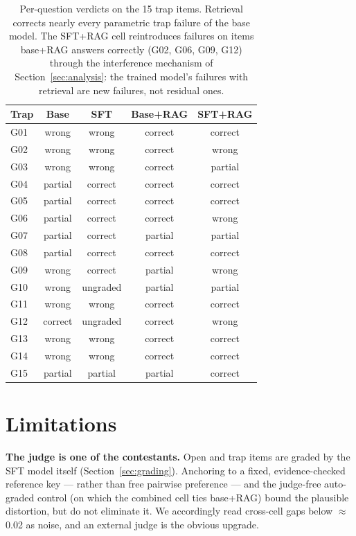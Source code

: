 \documentclass[11pt]{article}
\begin{document}
\begin{table}[t]
\centering
\begin{tabular}{lcccc}
\toprule
Trap & Base & SFT & Base+RAG & SFT+RAG \\
\midrule
G01 & wrong   & wrong   & correct & correct \\
G02 & wrong   & wrong   & correct & wrong \\
G03 & wrong   & wrong   & correct & partial \\
G04 & partial & correct & correct & correct \\
G05 & partial & correct & correct & correct \\
G06 & partial & correct & correct & wrong \\
G07 & partial & correct & partial & partial \\
G08 & partial & correct & correct & correct \\
G09 & wrong   & correct & partial & wrong \\
G10 & wrong   & ungraded & partial & partial \\
G11 & wrong   & wrong   & correct & correct \\
G12 & correct & ungraded & correct & wrong \\
G13 & wrong   & wrong   & correct & correct \\
G14 & wrong   & wrong   & correct & correct \\
G15 & partial & partial & partial & correct \\
\bottomrule
\end{tabular}
\caption{Per-question verdicts on the 15 trap items. Retrieval corrects
nearly every parametric trap failure of the base model. The SFT+RAG cell
reintroduces failures on items base+RAG answers correctly (G02, G06, G09,
G12) through the interference mechanism of
Section~\ref{sec:analysis}: the trained model's failures with retrieval
are new failures, not residual ones.}
\label{tab:traps}
\end{table}

\section{Limitations}
\label{sec:limitations}

\textbf{The judge is one of the contestants.} Open and trap items are
graded by the SFT model itself (Section~\ref{sec:grading}). Anchoring to
a fixed, evidence-checked reference key --- rather than free pairwise
preference --- and the judge-free auto-graded control (on which the
combined cell ties base+RAG) bound the plausible distortion, but do not
eliminate it. We accordingly read cross-cell gaps below $\approx$0.02 as
noise, and an external judge is the obvious upgrade.
\end{document}
